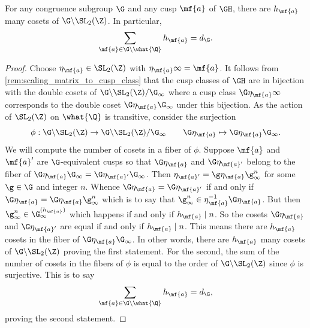 \documentclass[12pt]{article}
\begin{document}
      \begin{proposition}\label{prop:sum_of_widths_equals_index}
        For any congruence subgroup \(\G\) and any cusp \(\mf{a}\) of \(\GH\), there are \(h_{\mf{a}}\) many cosets of \(\G\backslash\SL_{2}(\Z)\). In particular,
        \[
          \sum_{\mf{a} \in \G\backslash\what{\Q}}h_{\mf{a}} = d_{\G}.
        \]
      \end{proposition}
      \begin{proof}
        Choose \(\eta_{\mf{a}} \in \SL_{2}(\Z)\) with \(\eta_{\mf{a}}\infty = \mf{a}\). It follows from \cref{rem:scaling_matrix_to_cusp_class} that the cusp classes of \(\GH\) are in bijection with the double cosets of \(\G\backslash\SL_{2}(\Z)/\G_{\infty}\) where a cusp class \(\G\eta_{\mf{a}}\infty\) corresponds to the double coset \(\G\eta_{\mf{a}}\G_{\infty}\) under this bijection. As the action of \(\SL_{2}(\Z)\) on \(\what{\Q}\) is transitive, consider the surjection
        \[
          \phi:\G\backslash\SL_{2}(\Z) \to \G\backslash\SL_{2}(\Z)/\G_{\infty} \qquad \G\eta_{\mf{a}} \mapsto \G\eta_{\mf{a}}\G_{\infty}.
        \]
        We will compute the number of cosets in a fiber of \(\phi\). Suppose \(\mf{a}\) and \(\mf{a}'\) are \(\G\)-equivalent cusps so that \(\G\eta_{\mf{a}}\) and \(\G\eta_{\mf{a}'}\) belong to the fiber of \(\G\eta_{\mf{a}}\G_{\infty} = \G\eta_{\mf{a}'}\G_{\infty}\). Then \(\eta_{\mf{a}'} = \g\eta_{\mf{a}}\g_{\infty}^{n}\) for some \(\g \in \G\) and integer \(n\). Whence \(\G\eta_{\mf{a}} = \G\eta_{\mf{a}'}\) if and only if \(\G\eta_{\mf{a}} =  \G\eta_{\mf{a}}\g_{\infty}^{n}\) which is to say that \(\g_{\infty}^{n} \in \eta_{\mf{a}}^{-1}\G\eta_{\mf{a}}\). But then \(\g_{\infty}^{n} \in \G_{\infty}^{(h_{\mf{a}})}\) which happens if and only if \(h_{\mf{a}} \mid n\). So the cosets \(\G\eta_{\mf{a}}\) and \(\G\eta_{\mf{a}'}\) are equal if and only if \(h_{\mf{a}} \mid n\). This means there are \(h_{\mf{a}}\) cosets in the fiber of \(\G\eta_{\mf{a}}\G_{\infty}\). In other words, there are \(h_{\mf{a}}\) many cosets of \(\G\backslash\SL_{2}(\Z)\) proving the first statement. For the second, the sum of the number of cosets in the fibers of \(\phi\) is equal to the order of \(\G\backslash\SL_{2}(\Z)\) since \(\phi\) is surjective. This is to say
        \[
          \sum_{\mf{a} \in \G\backslash\what{\Q}}h_{\mf{a}} = d_{\G},
        \]
        proving the second statement.
      \end{proof}
\end{document}

